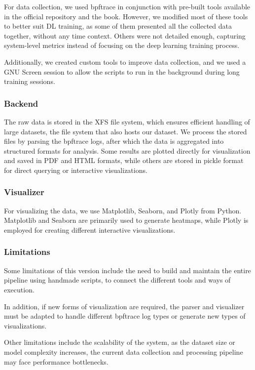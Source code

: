 \documentclass[conference]{IEEEtran}
\begin{document}
For data collection, we used bpftrace\cite{bpftrace} in conjunction with pre-built tools available in the official repository and the book\cite{bgreggBook}.
However, we modified most of these tools to better suit DL training, as some of them presented all the collected data together, without any time context.
Others were not detailed enough, capturing system-level metrics instead of focusing on the deep learning training process.

Additionally, we created custom tools to improve data collection, and we used a GNU Screen \cite{screen} session to allow the scripts to run in the background during long training sessions.

\subsubsection{Backend}

The raw data is stored in the XFS file system, which ensures efficient handling of large datasets, the file system that also hosts our dataset.
We process the stored files by parsing the bpftrace logs, after which the data is aggregated into structured formats for analysis.
Some results are plotted directly for visualization and saved in PDF and HTML formats, while others are stored in pickle format for direct querying or interactive visualizations.

\subsubsection{Visualizer}

For visualizing the data, we use Matplotlib, Seaborn, and Plotly from Python.
Matplotlib and Seaborn are primarily used to generate heatmaps, while Plotly is employed for creating different interactive visualizations.

\subsubsection{Limitations}

Some limitations of this version include the need to build and maintain the entire pipeline using handmade scripts, to connect the different tools and ways of execution.

In addition, if new forms of visualization are required, the parser and visualizer must be adapted to handle different bpftrace log types or generate new types of visualizations.

Other limitations include the scalability of the system, as the dataset size or model complexity increases, the current data collection and processing pipeline may face performance bottlenecks.
\end{document}
